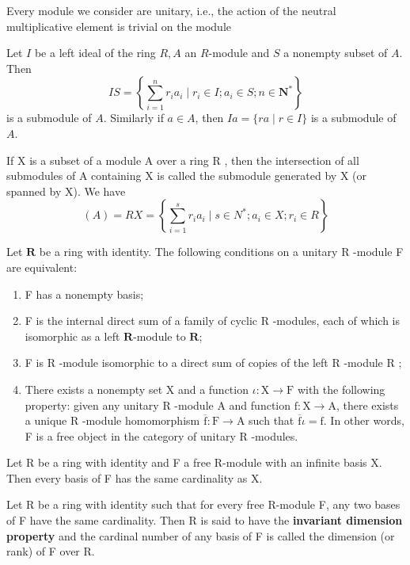 Every module we consider are unitary, i.e., the action of the neutral multiplicative element is trivial on the module

Let $I$ be a left ideal of the ring $R, A$ an $R$-module and $S$ a nonempty subset of $A$. Then $$I S=\left\{\sum_{i=1}^n r_i a_i \mid r_i \in I ; a_i \in S ; n \in \mathbf{N}^*\right\}$$ is a submodule of $A$. Similarly if $a \in A$, then $I a=\{r a \mid r \in I\}$ is a submodule of $A$. 

If X is a subset of a module A over a ring R , then the intersection of all submodules of A containing X is called the submodule generated by X (or spanned by X). We have $$(A)=R X=\left\{\sum_{i=1}^s r_i a_i \mid s \in N^* ; a_i \in X ; r_i \in R\right\}$$

\begin{theo} Let $\mathbf{R}$ be a ring with identity. The following conditions on a unitary R -module F are equivalent:
    \begin{enumerate}
        \item F has a nonempty basis;
        \item F is the internal direct sum of a family of cyclic R -modules, each of which is isomorphic as a left $\mathbf{R}$-module to $\mathbf{R}$;
        \item F is R -module isomorphic to a direct sum of copies of the left R -module R ;
        \item There exists a nonempty set X and a function $\iota: \mathrm{X} \rightarrow \mathrm{F}$ with the following property: given any unitary R -module A and function $\mathrm{f}: \mathrm{X} \rightarrow \mathrm{A}$, there exists a unique R -module homomorphism $\overline{\mathrm{f}}: \mathrm{F} \rightarrow \mathrm{A}$ such that $\overline{\mathrm{f}} \iota=\mathrm{f}$. In other words, F is a free object in the category of unitary R -modules.
    \end{enumerate}
\end{theo}

\begin{theo}
        Let R be a ring with identity and F a free R-module with an infinite basis X. Then every basis of F has the same cardinality as X.
\end{theo}

Let R be a ring with identity such that for every free R-module F, any two bases of F have the same cardinality. Then R is said to have the \textbf{invariant dimension property} and the cardinal number of any basis of F is called the dimension (or rank) of F over R. 

